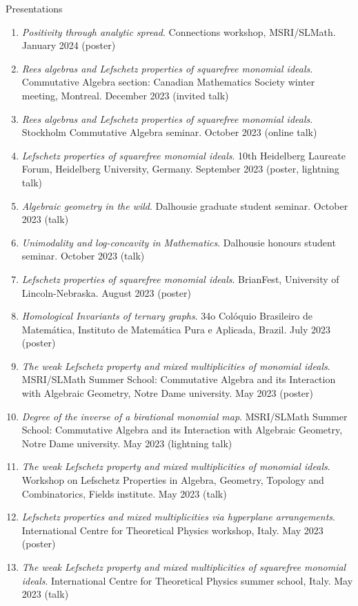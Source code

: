 \documentclass[12pt]{resume} %
\begin{document}
\begin{rSection}{Presentations}
\begin{enumerate}
        \item \textit{Positivity through analytic spread}. Connections workshop, MSRI/SLMath. January 2024 (poster)
        \item \textit{Rees algebras and Lefschetz properties of squarefree monomial ideals}. Commutative Algebra section: Canadian Mathematics Society winter meeting, Montreal. December 2023 (invited talk)
        \item \textit{Rees algebras and Lefschetz properties of squarefree monomial ideals}. Stockholm Commutative Algebra seminar. October 2023 (online talk)
        \item \textit{Lefschetz properties of squarefree monomial ideals}. 10th Heidelberg Laureate Forum, Heidelberg University, Germany. September 2023 (poster, lightning talk)
        \item \textit{Algebraic geometry in the wild}. Dalhousie graduate student seminar. October 2023 (talk)
        \item \textit{Unimodality and log-concavity in Mathematics}. Dalhousie honours student seminar. October 2023 (talk)
        \item \textit{Lefschetz properties of squarefree monomial ideals}. BrianFest, University of Lincoln-Nebraska. August 2023 (poster)
        \item \textit{Homological Invariants of ternary graphs}. 34o Colóquio Brasileiro de Matemática, Instituto de Matemática Pura e Aplicada, Brazil. July 2023 (poster)
        \item \textit{The weak Lefschetz property and mixed multiplicities of monomial ideals}. MSRI/SLMath Summer School: Commutative Algebra and its Interaction with Algebraic Geometry, Notre Dame university. May 2023 (poster)
        \item \textit{Degree of the inverse of a birational monomial map}. MSRI/SLMath Summer School: Commutative Algebra and its Interaction with Algebraic Geometry, Notre Dame university. May 2023 (lightning talk)
        \item \textit{The weak Lefschetz property and mixed multiplicities of monomial ideals}. Workshop on Lefschetz Properties in Algebra, Geometry, Topology and Combinatorics, Fields institute. May 2023 (talk)
        \item \textit{Lefschetz properties and mixed multiplicities via hyperplane arrangements}. International Centre for Theoretical Physics workshop, Italy. May 2023 (poster)
        \item \textit{The weak Lefschetz property and mixed multiplicities of squarefree monomial ideals}. International Centre for Theoretical Physics summer school, Italy. May 2023 (talk)

\end{enumerate}
\end{rSection}
\end{document}
